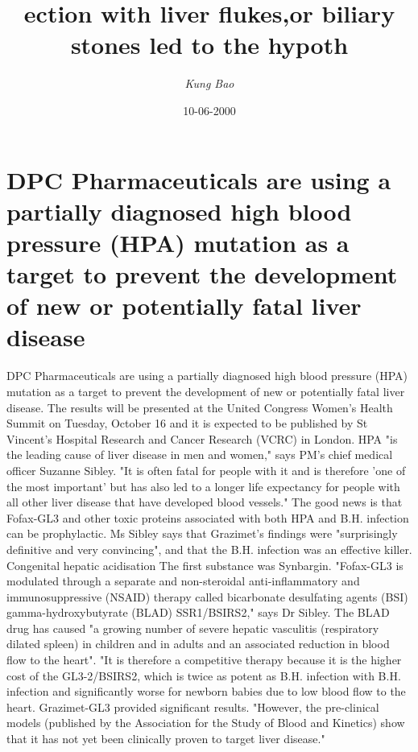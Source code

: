 \documentclass{article}%
\title{ection with liver flukes,or biliary stones led to the hypoth}%
\author{\textit{Kung Bao}}%
\date{10-06-2000}%
\begin{document}
%
\normalsize%
\maketitle%
\section{DPC Pharmaceuticals are using a partially diagnosed high blood pressure (HPA) mutation as a target to prevent the development of new or potentially fatal liver disease}%
\label{sec:DPCPharmaceuticalsareusingapartiallydiagnosedhighbloodpressure(HPA)mutationasatargettopreventthedevelopmentofneworpotentiallyfatalliverdisease}%
DPC Pharmaceuticals are using a partially diagnosed high blood pressure (HPA) mutation as a target to prevent the development of new or potentially fatal liver disease.\newline%
The results will be presented at the United Congress Women's Health Summit on Tuesday, October 16 and it is expected to be published by St Vincent's Hospital Research and Cancer Research (VCRC) in London.\newline%
HPA "is the leading cause of liver disease in men and women," says PM's chief medical officer Suzanne Sibley. "It is often fatal for people with it and is therefore 'one of the most important' but has also led to a longer life expectancy for people with all other liver disease that have developed blood vessels."\newline%
The good news is that Fofax{-}GL3 and other toxic proteins associated with both HPA and B.H. infection can be prophylactic.\newline%
Ms Sibley says that Grazimet's findings were "surprisingly definitive and very convincing", and that the B.H. infection was an effective killer.\newline%
Congenital hepatic acidisation\newline%
The first substance was Synbargin.\newline%
"Fofax{-}GL3 is modulated through a separate and non{-}steroidal anti{-}inflammatory and immunosuppressive (NSAID) therapy called bicarbonate desulfating agents (BSI) gamma{-}hydroxybutyrate (BLAD) SSR1/BSIRS2," says Dr Sibley.\newline%
The BLAD drug has caused "a growing number of severe hepatic vasculitis (respiratory dilated spleen) in children and in adults and an associated reduction in blood flow to the heart".\newline%
"It is therefore a competitive therapy because it is the higher cost of the GL3{-}2/BSIRS2, which is twice as potent as B.H. infection with B.H. infection and significantly worse for newborn babies due to low blood flow to the heart. Grazimet{-}GL3 provided significant results. "However, the pre{-}clinical models (published by the Association for the Study of Blood and Kinetics) show that it has not yet been clinically proven to target liver disease."\newline%
\end{document}
